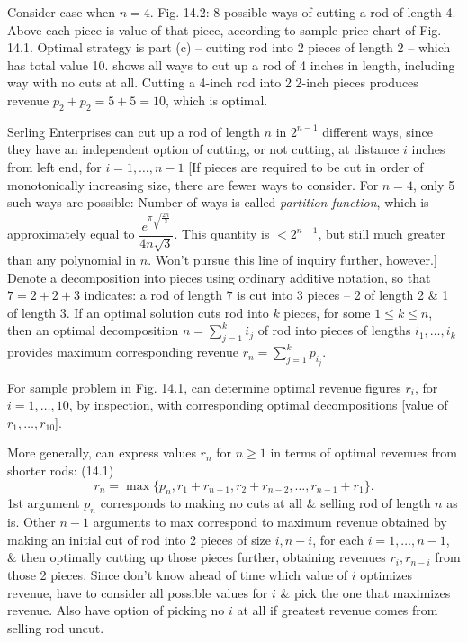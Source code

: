 \documentclass{article}
\begin{document}
\begin{itemize}
\begin{itemize}
\begin{itemize}
			Consider case when $n = 4$. {\sf Fig. 14.2: 8 possible ways of cutting a rod of length 4. Above each piece is value of that piece, according to sample price chart of Fig. 14.1. Optimal strategy is part (c) -- cutting rod into 2 pieces of length 2 -- which has total value 10.} shows all ways to cut up a rod of 4 inches in length, including way with no cuts at all. Cutting a 4-inch rod into 2 2-inch pieces produces revenue $p_2 + p_2 = 5 + 5 = 10$, which is optimal.
			
			Serling Enterprises can cut up a rod of length $n$ in $2^{n-1}$ different ways, since they have an independent option of cutting, or not cutting, at distance $i$ inches from left end, for $i = 1,\ldots,n-1$ [If pieces are required to be cut in order of monotonically increasing size, there are fewer ways to consider. For $n = 4$, only 5 such ways are possible: Number of ways is called {\it partition function}, which is approximately equal to $\dfrac{e^{\pi\sqrt{\frac{2n}{3}}}}{4n\sqrt{3}}$. This quantity is $< 2^{n-1}$, but still much greater than any polynomial in $n$. Won't pursue this line of inquiry further, however.] Denote a decomposition into pieces using ordinary additive notation, so that $7 = 2 + 2 + 3$ indicates: a rod of length $7$ is cut into 3 pieces -- 2 of length 2 \& 1 of length 3. If an optimal solution cuts rod into $k$ pieces, for some $1\le k\le n$, then an optimal decomposition $n = \sum_{j=1}^k i_j$ of rod into pieces of lengths $i_1,\ldots,i_k$ provides maximum corresponding revenue $r_n = \sum_{j=1}^k p_{i_j}$.
			
			For sample problem in {\sf Fig. 14.1}, can determine optimal revenue figures $r_i$, for $i = 1,\ldots,10$, by inspection, with corresponding optimal decompositions [value of $r_1,\ldots,r_{10}$].
			
			More generally, can express values $r_n$ for $n\ge1$ in terms of optimal revenues from shorter rods: (14.1)
			\begin{equation*}
				r_n = \max\{p_n,r_1 + r_{n-1},r_2 + r_{n-2},\ldots,r_{n-1} + r_1\}.
			\end{equation*}
			1st argument $p_n$ corresponds to making no cuts at all \& selling rod of length $n$ as is. Other $n - 1$ arguments to max correspond to maximum revenue obtained by making an initial cut of rod into 2 pieces of size $i,n-i$, for each $i = 1,\ldots,n - 1$, \& then optimally cutting up those pieces further, obtaining revenues $r_i,r_{n-i}$ from those 2 pieces. Since don't know ahead of time which value of $i$ optimizes revenue, have to consider all possible values for $i$ \& pick the one that maximizes revenue. Also have option of picking no $i$ at all if greatest revenue comes from selling rod uncut.
			

\end{itemize}
\end{itemize}
\end{itemize}
\end{document}
